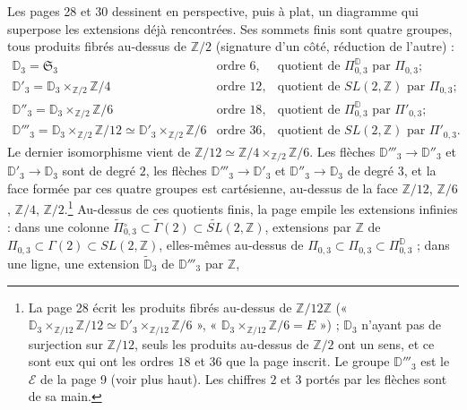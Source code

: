 \documentclass[11pt,a4paper]{article}
\begin{document}
Les pages 28 et 30 dessinent en perspective, puis à plat, un diagramme qui
superpose les extensions déjà rencontrées. Ses sommets finis sont quatre groupes,
tous produits fibrés au-dessus de $\mathbb{Z}/2$ (signature d'un côté, réduction
de l'autre) :
\[
\begin{array}{lll}
\mathbb{D}_3 = \mathfrak{S}_3 & \text{ordre } 6, & \text{quotient de }
\Pi^{\mathbb{D}}_{0,3} \text{ par } \Pi_{0,3} ; \\[2pt]
\mathbb{D}'_3 = \mathbb{D}_3 \times_{\mathbb{Z}/2} \mathbb{Z}/4 & \text{ordre } 12,
& \text{quotient de } SL(2, \mathbb{Z}) \text{ par } \Pi_{0,3} ; \\[2pt]
\mathbb{D}''_3 = \mathbb{D}_3 \times_{\mathbb{Z}/2} \mathbb{Z}/6 & \text{ordre } 18,
& \text{quotient de } \Pi^{\mathbb{D}}_{0,3} \text{ par } \Pi'_{0,3} ; \\[2pt]
\mathbb{D}'''_3 = \mathbb{D}_3 \times_{\mathbb{Z}/2} \mathbb{Z}/12
\simeq \mathbb{D}'_3 \times_{\mathbb{Z}/2} \mathbb{Z}/6 & \text{ordre } 36, &
\text{quotient de } SL(2, \mathbb{Z}) \text{ par } \Pi'_{0,3} .
\end{array}
\]
Le dernier isomorphisme vient de $\mathbb{Z}/12 \simeq \mathbb{Z}/4
\times_{\mathbb{Z}/2} \mathbb{Z}/6$. Les flèches $\mathbb{D}'''_3 \to
\mathbb{D}''_3$ et $\mathbb{D}'_3 \to \mathbb{D}_3$ sont de degré $2$, les flèches
$\mathbb{D}'''_3 \to \mathbb{D}'_3$ et $\mathbb{D}''_3 \to \mathbb{D}_3$ de degré
$3$, et la face formée par ces quatre groupes est cartésienne, au-dessus de la
face $\mathbb{Z}/12$, $\mathbb{Z}/6$, $\mathbb{Z}/4$, $\mathbb{Z}/2$.\footnote{La
page 28 écrit les produits fibrés au-dessus de $\mathbb{Z}/12\mathbb{Z}$
(« $\mathbb{D}_3 \times_{\mathbb{Z}/12} \mathbb{Z}/12 \simeq \mathbb{D}'_3
\times_{\mathbb{Z}/12} \mathbb{Z}/6$ », « $\mathbb{D}_3 \times_{\mathbb{Z}/12}
\mathbb{Z}/6 = E$ ») ; $\mathbb{D}_3$ n'ayant pas de surjection sur
$\mathbb{Z}/12$, seuls les produits au-dessus de $\mathbb{Z}/2$ ont un sens, et
ce sont eux qui ont les ordres $18$ et $36$ que la page inscrit. Le groupe
$\mathbb{D}'''_3$ est le $\mathcal{E}$ de la page 9 (voir plus haut). Les chiffres
$2$ et $3$ portés par les flèches sont de sa main.} Au-dessus de ces quotients
finis, la page empile les extensions infinies : dans une colonne
$\widetilde{\Pi}{}^{\circ}_{0,3} \subset \widetilde{\Gamma}(2) \subset
\widetilde{SL}(2, \mathbb{Z})$, extensions par $\mathbb{Z}$ de $\Pi_{0,3} \subset
\Gamma(2) \subset SL(2, \mathbb{Z})$, elles-mêmes au-dessus de
$\Pi_{0,3} \subset \Pi_{0,3} \subset \Pi^{\mathbb{D}}_{0,3}$ ; dans une ligne,
une extension $\widetilde{\mathbb{D}}_3$ de $\mathbb{D}'''_3$ par $\mathbb{Z}$,
\end{document}
